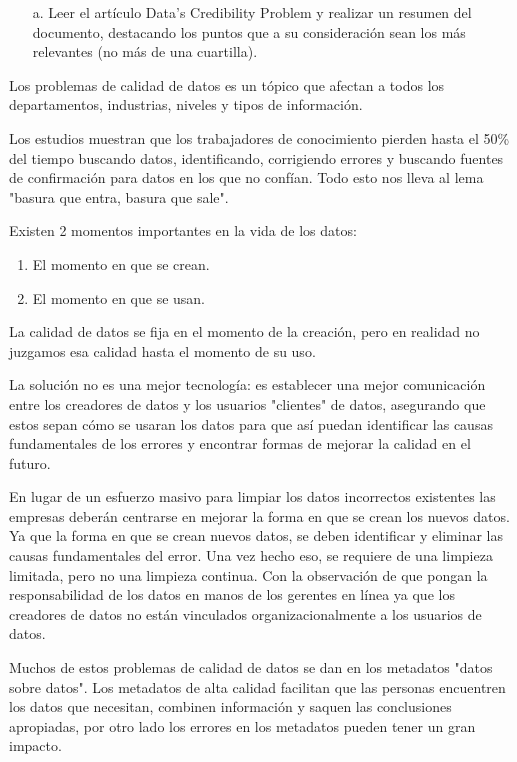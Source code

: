 \documentclass{article}
\begin{document}
\begin{itemize}
    \item[a.]Leer el artículo Data’s Credibility Problem y realizar un resumen del documento, destacando los puntos que a su consideración sean los más relevantes (no más de una cuartilla).
    \end{itemize}
    Los problemas de calidad de datos es un tópico que afectan a todos los departamentos, industrias, niveles y tipos de información.

Los estudios muestran que los trabajadores de conocimiento pierden hasta el 50\% del tiempo buscando datos, identificando, corrigiendo errores y buscando fuentes de confirmación para datos en los que no confían. Todo esto  nos lleva al lema "basura que entra, basura que sale". 

Existen 2 momentos importantes en la vida de los datos:
\begin{enumerate}
    \item El momento en que se crean.
    \item El momento en que se usan.
\end{enumerate}
	
La calidad de datos se fija en el momento de la creación, pero en realidad no juzgamos esa calidad hasta el momento de su uso. 

 La solución no es una mejor tecnología: es establecer una mejor comunicación entre los creadores de datos y los usuarios "clientes" de datos, asegurando que estos sepan cómo se usaran los datos para que así puedan identificar las causas fundamentales de los errores y encontrar formas de mejorar la calidad en el futuro. 

En lugar de un esfuerzo masivo para limpiar los datos incorrectos existentes las empresas deberán centrarse en mejorar la forma en que se crean los nuevos datos. Ya que la forma en que se crean nuevos datos, se deben identificar y eliminar las causas fundamentales del error. Una vez hecho eso, se requiere de una limpieza limitada, pero no una limpieza continua. Con la observación de que pongan la responsabilidad de los datos en manos de los gerentes en línea ya que los creadores de datos no están vinculados organizacionalmente a los usuarios de datos. 

Muchos de estos problemas de calidad de datos se dan en los metadatos "datos sobre datos". Los metadatos de alta calidad facilitan que las personas encuentren los datos que necesitan, combinen información y saquen las conclusiones apropiadas, por otro lado los errores en los metadatos pueden tener un gran impacto. 
\end{document}
